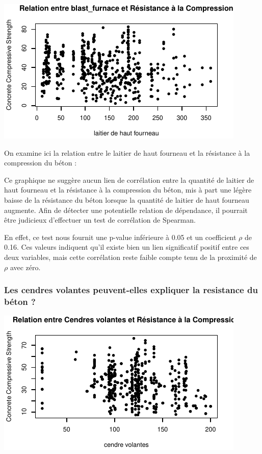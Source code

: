 \documentclass[
  12pt,
]{article}
\begin{document}
\begin{center}\includegraphics{rmd_final_files/figure-latex/unnamed-chunk-14-1} \end{center}

On examine ici la relation entre le laitier de haut fourneau et la
résistance à la compression du béton :

Ce graphique ne suggère aucun lien de corrélation entre la quantité de
laitier de haut fourneau et la résistance à la compression du béton, mis
à part une légère baisse de la résistance du béton lorsque la quantité
de laitier de haut fourneau augmente. Afin de détecter une potentielle
relation de dépendance, il pourrait être judicieux d'effectuer un test
de corrélation de Spearman.

En effet, ce test nous fournit une p-value inférieure à 0.05 et un
coefficient \(\rho\) de 0.16. Ces valeurs indiquent qu'il existe bien un
lien significatif positif entre ces deux variables, mais cette
corrélation reste faible compte tenu de la proximité de \(\rho\) avec
zéro.

\subsubsection{Les cendres volantes peuvent-elles expliquer la
resistance du béton
?}\label{les-cendres-volantes-peuvent-elles-expliquer-la-resistance-du-buxe9ton}

\begin{center}\includegraphics{rmd_final_files/figure-latex/unnamed-chunk-16-1} \end{center}
\end{document}
